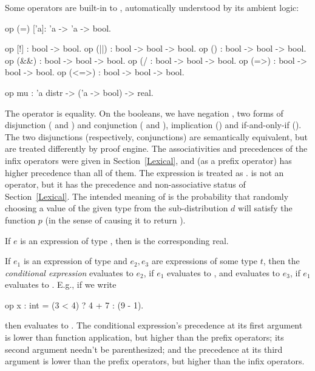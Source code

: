 Some operators are built-in to \EasyCrypt, automatically understood
by its ambient logic:
\begin{easycrypt}{}{}
op (=) ['a]: 'a -> 'a -> bool.

op [!] : bool -> bool.
op (||) : bool -> bool -> bool.
op (\/) : bool -> bool -> bool.
op (&&) : bool -> bool -> bool.
op (/\) : bool -> bool -> bool.
op (=>) : bool -> bool -> bool.
op (<=>) : bool -> bool -> bool.

op mu : 'a distr -> ('a -> bool) -> real.
\end{easycrypt}
The operator \ec{=} is equality. On the booleans, we have negation
\ec{!}, two forms of disjunction (\ec{\\/} and \ec{||}) and conjunction
(\ec{/\\} and \ec{&&}), implication (\ec{=>}) and if-and-only-if
(\ec{<=>}).  The two disjunctions (respectively, conjunctions) are
semantically equivalent, but are treated differently by \EasyCrypt
proof engine. The associativities and precedences of the infix
operators were given in Section~\ref{Lexical}, and (as a prefix
operator) \ec{!} has higher precedence than all of them. The
expression  is treated as . \ec{<>} is not an operator, but it has the precedence and
non-associative status of Section~\ref{Lexical}.
The intended meaning of  is the probability that
randomly choosing a value of the given type from the sub-distribution
$d$ will satisfy the function $p$ (in the sense of causing it to return
).

If $e$ is an expression of type , then
 is the corresponding real.

If $e_1$ is an expression of type  and $e_2,e_3$ are expressions
of some type $t$, then the \emph{conditional expression}
 evaluates to $e_2$, if $e_1$ evaluates to
, and evaluates to $e_3$, if $e_1$ evaluates to .
E.g., if we write
\begin{easycrypt}{}{}
op x : int = (3 < 4) ? 4 + 7 : (9 - 1).
\end{easycrypt}
then  evaluates to . The conditional expression's
precedence at its first argument is lower than function
application, but higher than the prefix operators; its second argument
needn't be parenthesized; and the precedence at its third argument is
lower than the prefix operators, but higher than the infix operators.

